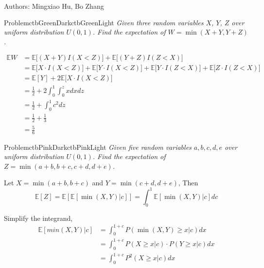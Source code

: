 \documentclass[12pt]{simple_doc}
\begin{document}

    Authors: Mingxiao Hu, Bo Zhang

    \begin{cbstripe}{Problem}{ctbGreenDark}{ctbGreenLight}
        \textit{Given three random variables $X$, $Y$, $Z$ over uniform distribution $U(0, 1)$. Find
        the expectation of $W = \min(X + Y, Y + Z)$.}
    \end{cbstripe}

    \begin{equation}
		\begin{aligned}
		\mathbb{E}{W} &= \mathbb{E}\Big[(X + Y)I(X < Z)\Big] + \mathbb{E}\Big[(Y + Z)I(Z < X)\Big] \\
		   &= \mathbb{E}\Big[X\cdot I(X < Z)\Big] + \mathbb{E}\Big[Y\cdot I(X < Z)\Big]
                + \mathbb{E}\Big[Y\cdot I(Z < X)\Big] + \mathbb{E}\Big[Z\cdot I(Z < X)\Big]\\
           &= \mathbb{E}[Y] + 2 \mathbb{E}\Big[X\cdot I(X < Z)\Big] \\
           &= \frac{1}{2} + 2 \int_0^1 \int_0^z xdxdz \\
           &= \frac{1}{2} + \int_0^1 c^2 dz \\
           &= \frac{1}{2} + \frac{1}{3} \\
           &= \frac{5}{6}
		\end{aligned}
	\end{equation}

    \begin{cbstripe}{Problem}{ctbPinkDark}{ctbPinkLight}
        \textit{Given five random variables $a, b, c, d, e$ over uniform distribution $U(0, 1)$. Find
        the expectation of $Z = \min(a + b, b + c, c + d, d + e)$.}
    \end{cbstripe}

    Let $X = \min(a + b, b + c)$ and $Y = \min(c + d, d + e)$, Then
    \begin{equation}
        \mathbb{E}[Z] = \mathbb{E}[\mathbb{E}[\min(X, Y)|c]] = \int_0^1 \mathbb{E}[\min(X, Y)|c]dc
    \end{equation}

    Simplify the integrand,
    \begin{equation}
        \begin{aligned}
        \mathbb{E}[min(X, Y)|c] &= \int_0^{1 + c} P(\min(X, Y) \geqslant x | c) dx\\
            &= \int_0^{1 + c} P(X \geqslant x | c) \cdot P(Y \geqslant x | c) dx\\
            &= \int_0^{1 + c} P^2 (X \geqslant x | c)  dx
        \end{aligned}
    \end{equation}
\end{document}
